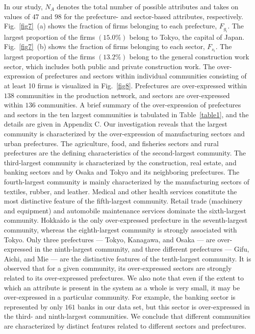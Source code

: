\documentclass[pre,floatfix,twocolumn,showpacs,a4paper,nofootinbib]{revtex4}
\begin{document}
In our study, $N_A$ denotes the total number of possible attributes and takes on values of $47$ and $98$ for the prefecture- and sector-based attributes, respectively.
Fig.~\ref{fig7}~(a) shows the fraction of firms belonging to each prefecture, $F_{g_i}$. The largest proportion of the firms $(15.0\%)$
belong to Tokyo, the capital of Japan.  
Fig.~\ref{fig7}~(b) shows the fraction of firms belonging to each sector, $F_{s_i}$. 
The largest proportion of the firms $(13.2\%)$ belong to the general construction work sector, which includes both public and private construction work.   
The over-expression of prefectures and sectors within individual communities consisting of at least 10 firms is visualized in Fig.~\ref{fig8}. Prefectures are over-expressed within
$138$ communities in the production network, and sectors are over-expressed within $136$ communities. A brief summary of the over-expression of prefectures and sectors in the ten largest communities is tabulated
in Table~\ref{table1}, and the details are given in Appendix C. Our investigation reveals that the largest community is characterized by the over-expression of manufacturing sectors and urban prefectures.
The agriculture, food, and fisheries sectors and rural prefectures are the defining characteristics of the second-largest community. The third-largest community is characterized by the construction, real estate, and banking sectors and by 
Osaka and Tokyo and its neighboring prefectures. The fourth-largest community is mainly characterized by the manufacturing sectors of textiles, rubber, and leather. Medical
and other health services constitute the most distinctive feature of the fifth-largest community. Retail trade (machinery and equipment) and automobile maintenance services dominate
 the sixth-largest community. Hokkaido is the only over-expressed prefecture in the seventh-largest community, whereas the eighth-largest community is strongly associated with Tokyo.
Only three prefectures --- Tokyo, Kanagawa, and Osaka --- are over-expressed in the ninth-largest community, and three different prefectures --- Gifu, Aichi, and Mie --- are the distinctive
features of the tenth-largest community. It is observed that for a given community, its over-expressed sectors are strongly related to its over-expressed prefectures.
We also note that even if the extent to which an attribute is present in the system as a whole is very small, it may be over-expressed in a particular community. For example, the banking
sector is represented by only $161$ banks in our data set, but this sector is over-expressed in the third- and ninth-largest communities. We conclude that different communities are characterized
by distinct features related to different sectors and prefectures. 
\end{document}
